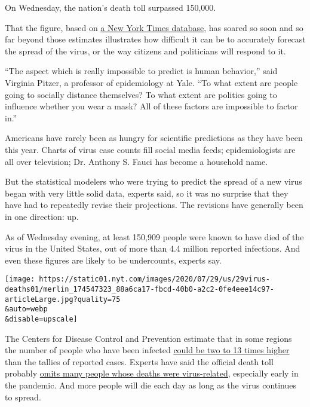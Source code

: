 On Wednesday, the nation's death toll surpassed 150,000.

That the figure, based on
\href{https://www.nytimes.com/interactive/2020/us/coronavirus-us-cases.html?action=click\&pgtype=Article\&state=default\&module=STYLN_pharmacy_components\&region=TOP_BANNER\&context=storylines_menu}{a
New York Times database}, has soared so soon and so far beyond those
estimates illustrates how difficult it can be to accurately forecast the
spread of the virus, or the way citizens and politicians will respond to
it.

``The aspect which is really impossible to predict is human behavior,''
said Virginia Pitzer, a professor of epidemiology at Yale. ``To what
extent are people going to socially distance themselves? To what extent
are politics going to influence whether you wear a mask? All of these
factors are impossible to factor in.''

Americans have rarely been as hungry for scientific predictions as they
have been this year. Charts of virus case counts fill social media
feeds; epidemiologists are all over television; Dr. Anthony S. Fauci has
become a household name.

But the statistical modelers who were trying to predict the spread of a
new virus began with very little solid data, experts said, so it was no
surprise that they have had to repeatedly revise their projections. The
revisions have generally been in one direction: up.

As of Wednesday evening, at least 150,909 people were known to have died
of the virus in the United States, out of more than 4.4 million reported
infections. And even these figures are likely to be undercounts, experts
say.

\texttt{[image: https://static01.nyt.com/images/2020/07/29/us/29virus-deaths01/merlin\_174547323\_88a6ca17-fbcd-40b0-a2c2-0fe4eee14c97-articleLarge.jpg?quality=75\\\&auto=webp\\\&disable=upscale]}

The Centers for Disease Control and Prevention estimate that in some
regions the number of people who have been infected
\href{https://www.nytimes.com/2020/07/21/health/coronavirus-infections-us.html}{could
be two to 13 times higher} than the tallies of reported cases. Experts
have said the official death toll probably
\href{https://www.nytimes.com/2020/04/05/us/coronavirus-deaths-undercount.html}{omits
many people whose deaths were virus-related,} especially early in the
pandemic. And more people will die each day as long as the virus
continues to spread.


